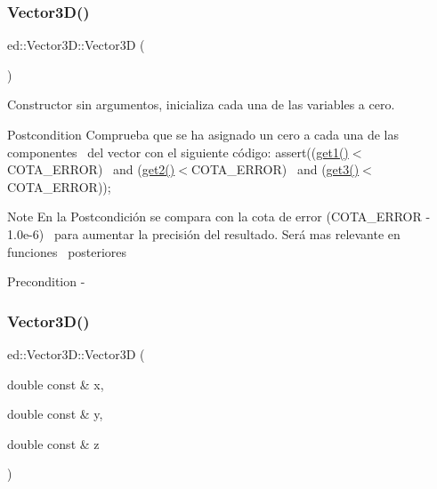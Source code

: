 \subsubsection{\texorpdfstring{Vector3\+D()}{Vector3D()}\hspace{0.1cm}{\footnotesize\ttfamily [1/3]}}
{\footnotesize\ttfamily ed\+::\+Vector3\+D\+::\+Vector3D (\begin{DoxyParamCaption}{ }\end{DoxyParamCaption})}



Constructor sin argumentos, inicializa cada una de las variables a cero. 

\begin{DoxyPostcond}{Postcondition}
Comprueba que se ha asignado un cero a cada una de las componentes~\newline
 del vector con el siguiente código\+: assert((\mbox{\hyperlink{classed_1_1Vector3D_ac96497e7c082fde19b4998408e4ec36b}{get1()}}$<$C\+O\+T\+A\+\_\+\+E\+R\+R\+OR)~\newline
 and (\mbox{\hyperlink{classed_1_1Vector3D_acb66f2ac0cb4f24592698fb317458e35}{get2()}}$<$C\+O\+T\+A\+\_\+\+E\+R\+R\+OR)~\newline
 and (\mbox{\hyperlink{classed_1_1Vector3D_a50c08e3089bc1b0cd5de77d8f0086cc0}{get3()}}$<$C\+O\+T\+A\+\_\+\+E\+R\+R\+OR));
\end{DoxyPostcond}
\begin{DoxyNote}{Note}
En la Postcondición se compara con la cota de error (C\+O\+T\+A\+\_\+\+E\+R\+R\+OR -\/ 1.\+0e-\/6)~\newline
 para aumentar la precisión del resultado. Será mas relevante en funciones~\newline
 posteriores
\end{DoxyNote}
\begin{DoxyPrecond}{Precondition}
-\/ 
\end{DoxyPrecond}
\mbox{\label{classed_1_1Vector3D_ab338fbfc5e42af056568727cdfccb0f2}} 
\subsubsection{\texorpdfstring{Vector3\+D()}{Vector3D()}\hspace{0.1cm}{\footnotesize\ttfamily [2/3]}}
{\footnotesize\ttfamily ed\+::\+Vector3\+D\+::\+Vector3D (\begin{DoxyParamCaption}\item[{double const \&}]{x,  }\item[{double const \&}]{y,  }\item[{double const \&}]{z }\end{DoxyParamCaption})}



